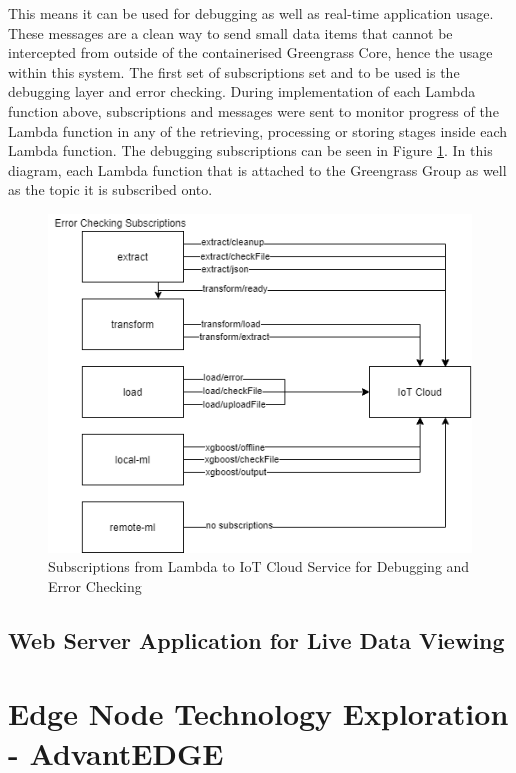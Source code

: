 This means it can be used for debugging as well as real-time application usage. These messages are a clean way to send small data items that cannot be intercepted from outside of the containerised Greengrass Core, hence the usage within this system. The first set of subscriptions set and to be used is the debugging layer and error checking. During implementation of each Lambda function above, subscriptions and messages were sent to monitor progress of the Lambda function in any of the retrieving, processing or storing stages inside each Lambda function. The debugging subscriptions can be seen in Figure \ref{fig:cloud_mqqt_layer}. In this diagram, each Lambda function that is attached to the Greengrass Group as well as the topic it is subscribed onto.

\begin{figure}[ht]
    \centering
    \includegraphics[width=1\linewidth]{pages/Chapter4/Chapter 4 Images/LambdaFns/iot_cloud_mqqt.png}
    \caption{Subscriptions from Lambda to IoT Cloud Service for Debugging and Error Checking}
    \label{fig:cloud_mqqt_layer}
\end{figure}

\subsection{Web Server Application for Live Data Viewing}


\section{Edge Node Technology Exploration - AdvantEDGE} %
